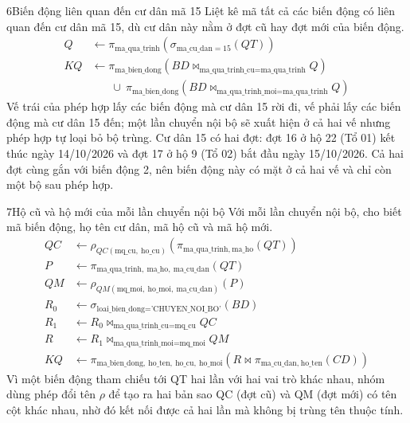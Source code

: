 \begin{racau}{6}{Biến động liên quan đến cư dân mã 15}
Liệt kê mã tất cả các biến động có liên quan đến cư dân mã 15, dù cư dân này nằm ở đợt cũ hay đợt mới của biến động.
\begin{equation*}
\begin{aligned}
Q &\leftarrow \pi_{\text{ma\_qua\_trinh}}\left(\sigma_{\text{ma\_cu\_dan} = 15}(QT)\right)\\
KQ &\leftarrow \pi_{\text{ma\_bien\_dong}}\left(BD \bowtie_{\text{ma\_qua\_trinh\_cu} = \text{ma\_qua\_trinh}} Q\right)\\
&\phantom{\leftarrow}\ \cup\ \pi_{\text{ma\_bien\_dong}}\left(BD \bowtie_{\text{ma\_qua\_trinh\_moi} = \text{ma\_qua\_trinh}} Q\right)
\end{aligned}
\end{equation*}
Vế trái của phép hợp lấy các biến động mà cư dân 15 rời đi, vế phải lấy các biến động mà cư dân 15 đến; một lần chuyển nội bộ sẽ xuất hiện ở cả hai vế nhưng phép hợp tự loại bỏ bộ trùng. Cư dân 15 có hai đợt: đợt 16 ở hộ 22 (Tổ 01) kết thúc ngày 14/10/2026 và đợt 17 ở hộ 9 (Tổ 02) bắt đầu ngày 15/10/2026. Cả hai đợt cùng gắn với biến động 2, nên biến động này có mặt ở cả hai vế và chỉ còn một bộ sau phép hợp.
\end{racau}

\begin{racau}{7}{Hộ cũ và hộ mới của mỗi lần chuyển nội bộ}
Với mỗi lần chuyển nội bộ, cho biết mã biến động, họ tên cư dân, mã hộ cũ và mã hộ mới.
\begin{equation*}
\begin{aligned}
QC &\leftarrow \rho_{QC(\text{mq\_cu},\ \text{ho\_cu})}\left(\pi_{\text{ma\_qua\_trinh},\ \text{ma\_ho}}(QT)\right)\\
P &\leftarrow \pi_{\text{ma\_qua\_trinh},\ \text{ma\_ho},\ \text{ma\_cu\_dan}}(QT)\\
QM &\leftarrow \rho_{QM(\text{mq\_moi},\ \text{ho\_moi},\ \text{ma\_cu\_dan})}(P)\\
R_0 &\leftarrow \sigma_{\text{loai\_bien\_dong} = \text{'CHUYEN\_NOI\_BO'}}(BD)\\
R_1 &\leftarrow R_0 \bowtie_{\text{ma\_qua\_trinh\_cu} = \text{mq\_cu}} QC\\
R &\leftarrow R_1 \bowtie_{\text{ma\_qua\_trinh\_moi} = \text{mq\_moi}} QM\\
KQ &\leftarrow \pi_{\text{ma\_bien\_dong},\ \text{ho\_ten},\ \text{ho\_cu},\ \text{ho\_moi}}\left(R \bowtie \pi_{\text{ma\_cu\_dan},\ \text{ho\_ten}}(CD)\right)
\end{aligned}
\end{equation*}
Vì một biến động tham chiếu tới QT hai lần với hai vai trò khác nhau, nhóm dùng phép đổi tên $\rho$ để tạo ra hai bản sao QC (đợt cũ) và QM (đợt mới) có tên cột khác nhau, nhờ đó kết nối được cả hai lần mà không bị trùng tên thuộc tính.
\end{racau}

